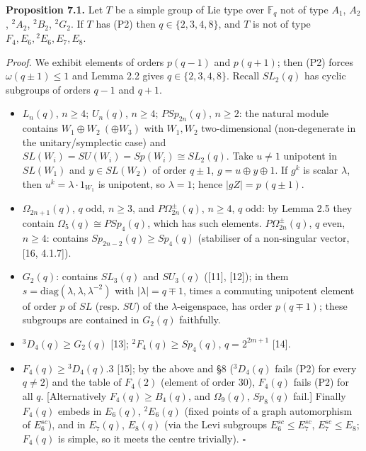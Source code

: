 \documentclass[11pt,a4paper]{article}
\providecommand{\tightlist}{\setlength{\itemsep}{1pt}\setlength{\parskip}{0pt}}
\begin{document}
\textbf{Proposition 7.1.} Let \(T\) be a simple group of Lie type over
\(\mathbb F_q\) not of type \(A_1\), \(A_2\), \({}^2A_2\), \({}^2B_2\),
\({}^2G_2\). If \(T\) has (P2) then \(q\in\{2,3,4,8\}\), and \(T\) is
not of type \(F_4,E_6,{}^2E_6,E_7,E_8\).

\emph{Proof.} We exhibit elements of orders \(p(q-1)\) and \(p(q+1)\);
then (P2) forces \(\omega(q\pm1)\le1\) and Lemma 2.2 gives
\(q\in\{2,3,4,8\}\). Recall \(SL_2(q)\) has cyclic subgroups of orders
\(q-1\) and \(q+1\).

\begin{itemize}
\tightlist
\item
  \(L_n(q)\), \(n\ge4\); \(U_n(q)\), \(n\ge4\); \(PSp_{2n}(q)\),
  \(n\ge2\): the natural module contains \(W_1\oplus W_2\ (\oplus W_3)\)
  with \(W_1,W_2\) two-dimensional (non-degenerate in the
  unitary/symplectic case) and \(SL(W_i)=SU(W_i)=Sp(W_i)\cong SL_2(q)\).
  Take \(u\ne1\) unipotent in \(SL(W_1)\) and \(y\in SL(W_2)\) of order
  \(q\pm1\), \(g=u\oplus y\oplus 1\). If \(g^k\) is scalar \(\lambda\),
  then \(u^k=\lambda\cdot 1_{W_1}\) is unipotent, so \(\lambda=1\);
  hence \(|gZ|=p\,(q\pm1)\).
\item
  \(\Omega_{2n+1}(q)\), \(q\) odd, \(n\ge3\), and
  \(P\Omega^\pm_{2n}(q)\), \(n\ge4\), \(q\) odd: by Lemma 2.5 they
  contain \(\Omega_5(q)\cong PSp_4(q)\), which has such elements.
  \(P\Omega^\pm_{2n}(q)\), \(q\) even, \(n\ge4\): contains
  \(Sp_{2n-2}(q)\ge Sp_4(q)\) (stabiliser of a non-singular vector,
  {[}16, 4.1.7{]}).
\item
  \(G_2(q)\): contains \(SL_3(q)\) and \(SU_3(q)\) ({[}11{]}, {[}12{]});
  in them \(s=\mathrm{diag}(\lambda,\lambda,\lambda^{-2})\) with
  \(|\lambda|=q\mp1\), times a commuting unipotent element of order
  \(p\) of \(SL\) (resp. \(SU\)) of the \(\lambda\)-eigenspace, has
  order \(p(q\mp1)\); these subgroups are contained in \(G_2(q)\)
  faithfully.
\item
  \({}^3D_4(q)\ge G_2(q)\) {[}13{]}; \({}^2F_4(q)\ge Sp_4(q)\),
  \(q=2^{2m+1}\) {[}14{]}.
\item
  \(F_4(q)\ge {}^3D_4(q).3\) {[}15{]}; by the above and §8
  (\({}^3D_4(q)\) fails (P2) for every \(q\ne2\)) and the table of
  \(F_4(2)\) (element of order \(30\)), \(F_4(q)\) fails (P2) for all
  \(q\). {[}Alternatively \(F_4(q)\ge B_4(q)\), and \(\Omega_9(q)\),
  \(Sp_8(q)\) fail.{]} Finally \(F_4(q)\) embeds in \(E_6(q)\),
  \({}^2E_6(q)\) (fixed points of a graph automorphism of \(E_6^{sc}\)),
  and in \(E_7(q)\), \(E_8(q)\) (via the Levi subgroups
  \(E_6^{sc}\le E_7^{sc}\), \(E_7^{sc}\le E_8\); \(F_4(q)\) is simple,
  so it meets the centre trivially). \(\square\)
\end{itemize}
\end{document}
